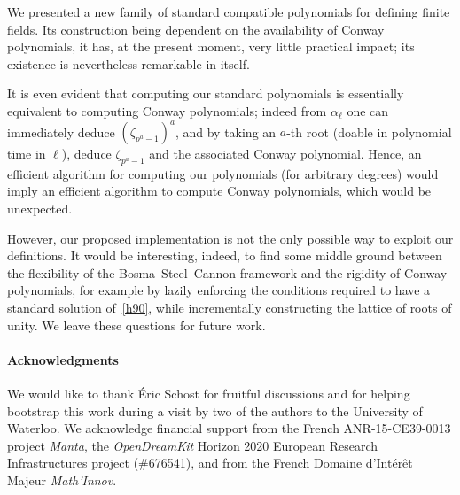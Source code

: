 \documentclass{sig-alternate}
\begin{document}
We presented a new family of standard compatible polynomials for
defining finite fields. %
Its construction being dependent on the availability of Conway
polynomials, it has, at the present moment, very little practical
impact; its existence is nevertheless remarkable in itself.

It is even evident that computing our standard polynomials is
essentially equivalent to computing Conway polynomials; indeed from
$\alpha_\ell$ one can immediately deduce $(\zeta_{p^a-1})^a$, and by
taking an $a$-th root (doable in polynomial time in $\ell$), deduce
$\zeta_{p^a-1}$ and the associated Conway polynomial. %
Hence, an efficient algorithm for computing our polynomials (for
arbitrary degrees) would imply an efficient algorithm to compute
Conway polynomials, which would be unexpected.

However, our proposed implementation is not the only possible way to
exploit our definitions. %
It would be interesting, indeed, to find some middle ground between
the flexibility of the Bosma--Steel--Cannon framework and the rigidity
of Conway polynomials, for example by lazily enforcing the conditions
required to have a standard solution of~\eqref{h90}, while
incrementally constructing the lattice of roots of unity. %
We leave these questions for future work.


\paragraph{Acknowledgments}
We would like to thank \'Eric Schost for fruitful discussions and for
helping bootstrap this work during a visit by two of the authors to
the University of Waterloo. %
We acknowledge financial support from the French ANR-15-CE39-0013
project \emph{Manta}, the \emph{OpenDreamKit} Horizon 2020 European
Research Infrastructures project (\#676541), and from the French
Domaine d'Int\'er\^et Majeur \emph{Math'Innov}.



\end{document}
